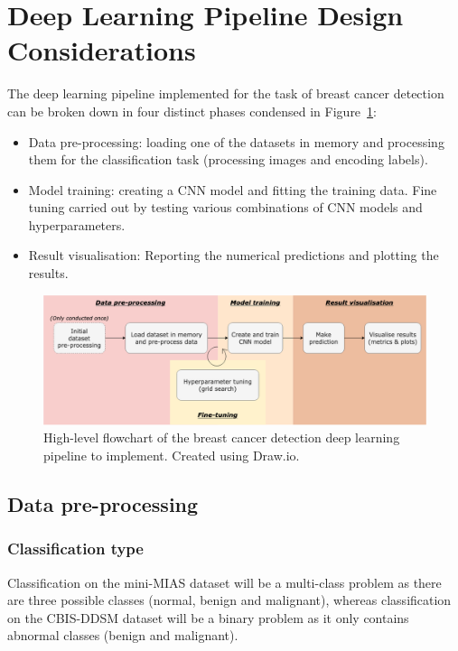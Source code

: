 \section{Deep Learning Pipeline Design Considerations}

The deep learning pipeline implemented for the task of breast cancer detection can be broken down in four distinct phases condensed in Figure~\ref{fig:design-flowchart}:

\begin{itemize}
    \item Data pre-processing: loading one of the datasets in memory and processing them for the classification task (processing images and encoding labels).
    \item Model training: creating a CNN model and fitting the training data. Fine tuning carried out by testing various combinations of CNN models and hyperparameters.
    \item Result visualisation: Reporting the numerical predictions and plotting the results.
    \end{itemize}

\begin{figure}[ht]
\centerline{\includegraphics[width=1.1\textwidth]{figures/design/design flowchart.png}}
\caption{\label{fig:design-flowchart}High-level flowchart of the breast cancer detection deep learning pipeline to implement. Created using Draw.io.}
\end{figure}


\subsection{Data pre-processing}

\subsubsection{Classification type}

Classification on the mini-MIAS dataset will be a multi-class problem as there are three possible classes (normal, benign and malignant), whereas classification on the CBIS-DDSM dataset will be a binary problem as it only contains abnormal classes (benign and malignant).

